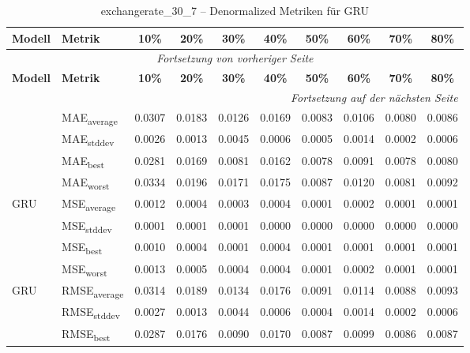 {\small
\begin{longtable}{l l c c c c c c c c}
    \toprule
    \textbf{Modell} & \textbf{Metrik} & \textbf{10\%} & \textbf{20\%} & \textbf{30\%} & \textbf{40\%} & \textbf{50\%} & \textbf{60\%} & \textbf{70\%} & \textbf{80\%} \\
    \midrule
    \endfirsthead
    \multicolumn{10}{c}{\textit{Fortsetzung von vorheriger Seite}} \\
    \toprule
    \textbf{Modell} & \textbf{Metrik} & \textbf{10\%} & \textbf{20\%} & \textbf{30\%} & \textbf{40\%} & \textbf{50\%} & \textbf{60\%} & \textbf{70\%} & \textbf{80\%} \\
    \midrule
    \endhead
    \midrule
    \multicolumn{10}{r}{\textit{Fortsetzung auf der nächsten Seite}} \\
    \midrule
    \endfoot
    \bottomrule
    \caption{exchangerate_30_7 -- Denormalized Metriken für GRU}
    \label{tab:exchangerate_30_7_denormalized_gru}
    \endlastfoot
\multirow{4}{*}{GRU} & MAE\textsubscript{average} & 0.0307 & 0.0183 & 0.0126 & 0.0169 & 0.0083 & 0.0106 & 0.0080 & 0.0086 \\
 & MAE\textsubscript{stddev} & 0.0026 & 0.0013 & 0.0045 & 0.0006 & 0.0005 & 0.0014 & 0.0002 & 0.0006 \\
 & MAE\textsubscript{best} & 0.0281 & 0.0169 & 0.0081 & 0.0162 & 0.0078 & 0.0091 & 0.0078 & 0.0080 \\
 & MAE\textsubscript{worst} & 0.0334 & 0.0196 & 0.0171 & 0.0175 & 0.0087 & 0.0120 & 0.0081 & 0.0092 \\
\cmidrule(lr){2-10}
\multirow{4}{*}{GRU} & MSE\textsubscript{average} & 0.0012 & 0.0004 & 0.0003 & 0.0004 & 0.0001 & 0.0002 & 0.0001 & 0.0001 \\
 & MSE\textsubscript{stddev} & 0.0001 & 0.0001 & 0.0001 & 0.0000 & 0.0000 & 0.0000 & 0.0000 & 0.0000 \\
 & MSE\textsubscript{best} & 0.0010 & 0.0004 & 0.0001 & 0.0004 & 0.0001 & 0.0001 & 0.0001 & 0.0001 \\
 & MSE\textsubscript{worst} & 0.0013 & 0.0005 & 0.0004 & 0.0004 & 0.0001 & 0.0002 & 0.0001 & 0.0001 \\
\cmidrule(lr){2-10}
\multirow{4}{*}{GRU} & RMSE\textsubscript{average} & 0.0314 & 0.0189 & 0.0134 & 0.0176 & 0.0091 & 0.0114 & 0.0088 & 0.0093 \\
 & RMSE\textsubscript{stddev} & 0.0027 & 0.0013 & 0.0044 & 0.0006 & 0.0004 & 0.0014 & 0.0002 & 0.0006 \\
 & RMSE\textsubscript{best} & 0.0287 & 0.0176 & 0.0090 & 0.0170 & 0.0087 & 0.0099 & 0.0086 & 0.0087 \\

\end{longtable}}
